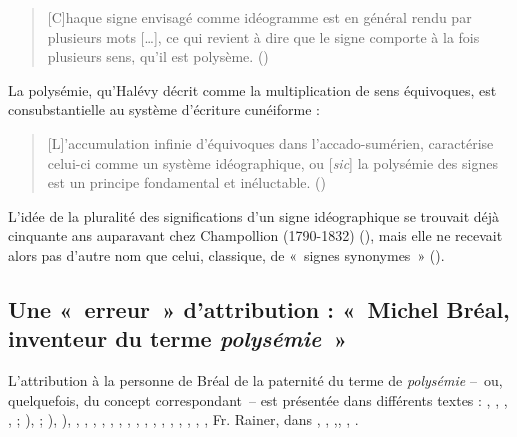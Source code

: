 \documentclass[output=paper]{langsci/langscibook}
\begin{document}
\begin{quote}
    
[C]haque signe envisagé comme idéogramme est en général rendu par plusieurs mots […], ce qui revient à dire que le signe comporte à la fois plusieurs sens, qu’il est polysème. (\citealt[275]{halevy_melanges_1883})

\end{quote}

La polysémie, qu’Halévy décrit comme la multiplication de sens équivoques, est consubstantielle au système d’écriture cunéiforme :

\begin{quote}
    [L]’accumulation infinie d’équivoques dans l’accado-sumérien, caractérise celui-ci comme un système idéographique, ou [\textit{sic}] la polysémie des signes est un principe fondamental et inéluctable. (\citealt[276]{halevy_melanges_1883})
\end{quote}

L’idée de la pluralité des significations d’un signe idéographique se trouvait déjà cinquante ans auparavant chez Champollion (1790-1832) (\citealt[311-312]{champollion_precis_1828}), mais elle ne recevait alors pas d’autre nom que celui, classique, de «~signes synonymes~» (\citealt[314]{champollion_precis_1828}).

\subsection{Une «~erreur~» d’attribution : «~Michel Bréal, inventeur du terme \textit{polysémie~}»}

L’attribution à la personne de Bréal de la paternité du terme de \textit{polysémie}  –~ou, quelquefois, du concept correspondant~– est présentée dans différents textes : \citet[15]{firth_technique_1957}, \citet[199]{ullmann_precis_1952}, \citet[147]{ricoeur_metaphore_1975}, \citet[286]{delesalle_linguistique_1986}, \citet[89]{delesalle_statut_1986}; \citeyear[300-305]{delesalle_vie_1987}), \citet[22] {nerlich_avant-propos_1993}; \citeyear[1625]{nerlich_study_2001}), \citet[169-170]{peeters_verbe_1993}), \citet{peeters_compte_1994}, \citet[27]{desmet_grammaire_1995}, \citet[118]{branca-rosoff_polysemie_1996}, \citet[11]{victorri_polysemie._1996}, \citet[16]{surcin_expression_1999}, \citet[215]{auroux_semantique_2000}, \citet[156]{siblot_emission_2000}, \citet[4]{nerlich_polysemy:_2003}, \citet[131]{girardin_polysemie_2004}, \citet[51]{piron_analyse_2006}, \citet[55]{cusimano_essai_2008}, \citet[22]{larrivee_histoire_2008}, \citet[116]{thibault_traitement_2009}, \citet[10]{mazaleyrat_vers_2010}, \citet[23]{pauly_polysemie._2010}, \citet[n. p.]{jakimovska_terminologie_2012}, Fr. Rainer, dans \citet{lieber_oxford_2014}, \citet[59]{derradji_forme_2014}, \citet[6]{sorba_presentation_2014},\citet[23]{bisconti_sens_2016}, \citet[4]{bruns_polysemie_2016}, \citet[103]{de_palo_invention_2016}.
\end{document}
